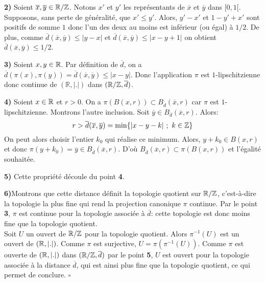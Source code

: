 	\par \textbf{2)} Soient $\overline{x}, \overline{y} \in {\mathbb{R}}/{\mathbb{Z}}$. Notons $x'$ et $y'$ les représentants de $\overline{x}$ et $\overline{y}$ dans $[0,1[$. Supposons, sans perte de généralité, que $x'\leq y'$. Alors, $y'-x'$ et $1-y'+x'$ sont positifs de somme $1$ donc l'un des deux au moins est inférieur (ou égal) à $1/2$. De plus, comme $\overline{d}(\overline{x},\overline{y})\leq|y-x| $ et $\overline{d}(\overline{x},\overline{y})\leq|x-y+1|$ on obtient $\overline{d}(\overline{x},\overline{y})\leq1/2$.\\

	\par\textbf{3)} Soient $x,y \in {\mathbb{R}}$. Par définition de $\overline{d}$, on a $\overline{d}(\pi(x),\pi(y))=\overline{d}(\overline{x},\overline{y})\leq |x-y|$. Donc l'application $\pi$ est $1$-lipschitzienne donc continue de $(\mathbb{R},|.|)$ dans $({\mathbb{R}}/\mathbb{Z},\overline{d})$. \\

	\par\textbf{4)} Soient $x \in {\mathbb{R}}$ et $r>0$. On a $\pi(B(x,r))\subset B_{\overline{d}}(\overline{x},r)$ car $\pi$ est $1$-lipschitzienne. Montrons l'autre inclusion. Soit $\overline{y} \in B_{\overline{d}}(\overline{x},r)$. Alors:
	$$r>\overline{d}(\overline{x},\overline{y})= \min\lbrace |x-y-k|\ ;\ k \in {\mathbb{Z}}\rbrace$$
	On peut alors choisir l'entier $k_0$ qui réalise ce minimum. Alors, $y+k_0 \in B(x,r)$ et donc $\pi(y+k_0)= \overline{y} \in B_{\overline{d}}(\overline{x},r)$. D'où $B_{\overline{d}}(\overline{x},r) \subset \pi(B(x,r))$ et l'égalité souhaitée.\\

	\par \textbf{5)} Cette propriété découle du point \textbf{4}.\\


	\par\textbf{6)}Montrons que cette distance définit la topologie quotient sur ${\mathbb{R}}/{\mathbb{Z}}$, c'est-à-dire la topologie la plus fine qui rend la projection canonique $\pi$ continue. Par le point \textbf{3}, $\pi$ est continue pour la topologie associée à $\overline{d}$: cette topologie est donc moins fine que la topologie quotient.\\

	Soit $U$ un ouvert de ${\mathbb{R}}/{\mathbb{Z}}$ pour la topologie quotient. Alors $\pi^{-1}(U)$ est un ouvert de $({\mathbb{R}}, |.|)$. Comme $\pi$ est surjective, $U=\pi (\pi^{-1}(U))$. Comme $\pi$ est ouverte de $({\mathbb{R}},|.|)$ dans $({\mathbb{R}}/{\mathbb{Z}},\overline{d})$ par le point \textbf{5}, $U$ est ouvert pour la topologie associée à la distance $\overline{d}$, qui est ainsi plus fine que la topologie quotient, ce qui permet de conclure. \hfill $\square$\\














